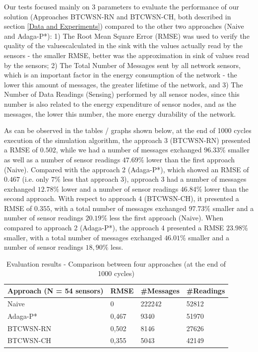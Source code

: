 \documentclass[conference]{IEEEtran}
\begin{document}
Our tests focused mainly on 3 parameters to evaluate the performance of our
solution (Approaches BTCWSN-RN and BTCWSN-CH, both described in section
\ref{Data and Experiments}) compared to the other two approaches (Naive and
Adaga-P*): 1) The Root Mean Square Error (RMSE) was used to verify the quality
of the values ​​calculated in the sink with the values ​​actually read by the
sensors - the smaller RMSE, better was the approximation in sink of values
​​read by the sensors; 2) The Total Number of Messages sent by all network
sensors, which is an important factor in the energy consumption of the network -
the lower this amount of messages, the greater lifetime of the network, and 3)
The Number of Data Readings (Sensing) performed by all sensor nodes, since this
number is also related to the energy expenditure of sensor nodes, and as the
messages, the lower this number, the more energy durability of the network.

As can be observed in the tables / graphs shown below, at the end of 1000 cycles
execution of the simulation algorithm, the approach 3 (BTCWSN-RN) presented a
RMSE of $0.502$, while we had a number of messages exchanged $96.33\%$ smaller
as well as a number of sensor readings $47.69\%$ lower than the first
approach (Naive). Compared with the approach 2 (Adaga-P*), which showed an
RMSE of $0.467$ (i.e. only $7\%$ less that approach 3), approach 3 had a
number of messages exchanged $12.78\%$ lower and a number of sensor readings
$46.84\%$ lower than the second approach.
With respect to approach 4 (BTCWSN-CH), it presented a RMSE of $0.355$, with a
total number of messages exchanged $97.73\%$ smaller and a number of sensor
readings $20.19\%$ less the first approach (Naive). When compared to approach 2
(Adaga-P*), the approach 4 presented a RMSE $23.98\%$ smaller, with a total
number of messages exchanged $46.01\%$ smaller and a number of sensor readings
$18,90\%$ less.

\begin{table}[h!]
\caption{Evaluation results - Comparison between four approaches (at the end of 1000 cycles)}
\begin{center}
\begin{tabular}{|l||l|l|l|}
\hline
Approach (N = 54 sensors) &RMSE &\#Messages &\#Readings \\
\hline\hline
Naive &0 &222242 &52812 \\
\hline
Adaga-P* &0,467 &9340 &51970 \\
\hline
BTCWSN-RN &0,502 &8146 &27626 \\
\hline
BTCWSN-CH &0,355 &5043 &42149 \\
\hline
\end{tabular}
\end{center}
\end{table}
\end{document}
